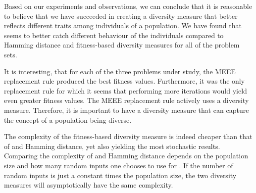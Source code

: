 Based on our experiments and observations, we can conclude that it is reasonable to believe that we have succeeded in creating a diversity measure that better reflects different traits among individuals of a population. We have found that \dia{} seems to better catch different behaviour of the individuals compared to Hamming distance and fitness-based diversity measures for all of the problem sets.

It is interesting, that for each of the three problems under study, the MEEE replacement rule produced the best fitness values. Furthermore, it was the only replacement rule for which it seems that performing more iterations would yield even greater fitness values. 
The MEEE replacement rule actively uses a diversity measure.
Therefore, it is important to have a diversity measure that can capture the concept of a population being diverse.


The complexity of the fitness-based diversity measure is indeed cheaper than that of \dia{} and Hamming distance, yet also yielding the most stochastic results. Comparing the complexity of \dia{} and Hamming distance depends on the population size and how many random inputs one chooses to use for \dia{}. If the number of random inputs is just a constant times the population size, the two diversity measures will asymptotically have the same complexity.

